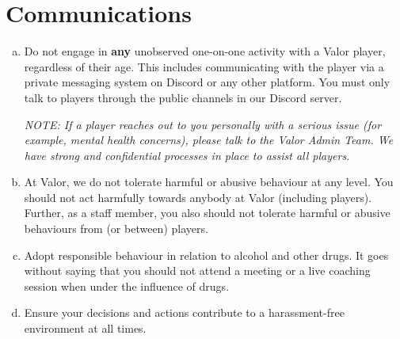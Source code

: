 \documentclass[10pt]{article}
\begin{document}
\section{Communications}
\begin{enumerate}[(a)]
	\item Do not engage in \textbf{any} unobserved one-on-one activity with a Valor player, regardless of their age. This includes communicating with the player via a private messaging system on Discord or any other platform. You must only talk to players through the public channels in our Discord server.

	\itshape
	NOTE: If a player reaches out to you personally with a serious issue (for example, mental health concerns), please talk to the Valor Admin Team. We have strong and confidential processes in place to assist all players.
	\normalshape

	\item At Valor, we do not tolerate harmful or abusive behaviour at any level. You should not act harmfully towards anybody at Valor (including players). Further, as a staff member, you also should not tolerate harmful or abusive behaviours from (or between) players.

	\item Adopt responsible behaviour in relation to alcohol and other drugs. It goes without saying that you should not attend a meeting or a live coaching session when under the influence of drugs.

	\item Ensure your decisions and actions contribute to a harassment-free environment at all times.
	\normalshape
\end{enumerate}
\end{document}
